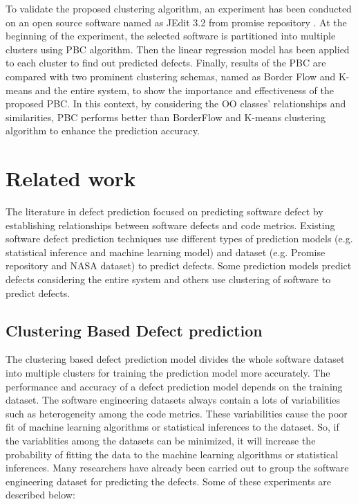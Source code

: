 \documentclass[12pt]{report}
\begin{document}
To validate the proposed clustering algorithm, an experiment has been conducted on an open source software named as JEdit 3.2 from promise repository \cite{promise12}. At the beginning of the experiment, the selected software is partitioned into multiple clusters using PBC algorithm. Then the linear regression model has been applied to each cluster to find out predicted defects. Finally, results of the PBC are compared with two prominent clustering schemas, named as Border Flow and K-means and the entire system, to show the importance and effectiveness of the proposed PBC. In this context, by considering the OO classes' relationships and similarities, PBC performs better than BorderFlow and K-means clustering algorithm to enhance the prediction accuracy.

\section{Related work}

The literature in defect prediction focused on predicting software defect by establishing relationships between software defects and code metrics. Existing software defect prediction techniques use different types of prediction models (e.g. statistical inference and machine learning model) and dataset (e.g. Promise repository and NASA dataset) to predict defects. Some prediction models predict defects considering the entire system and others use clustering of software to predict defects. 
 
\subsection{Clustering Based Defect prediction}
The clustering based defect prediction model divides the whole software dataset into multiple clusters for training the prediction model more accurately. The performance and accuracy of a defect prediction model depends on the training dataset. The software engineering datasets always contain a lots of variabilities such as heterogeneity among the code metrics. These variabilities cause the poor fit of machine learning algorithms or statistical inferences to the dataset. So, if the variablities among the datasets can be minimized, it will increase the probability of fitting the data to the machine learning algorithms or statistical inferences. Many researchers have already been carried out to group the software engineering dataset for predicting the defects. Some of these experiments are described below:
\end{document}
